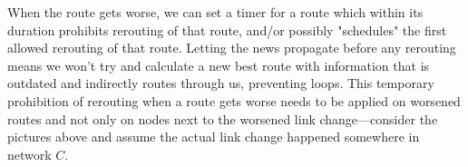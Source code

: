 \documentclass[10pt,a4paper]{article}
\begin{document}


When the route gets worse, we can set a timer for a route which within its duration prohibits rerouting of that route, and/or possibly "schedules" the first allowed rerouting of that route. Letting the news propagate before any rerouting means we won't try and calculate a new best route with information that is outdated and indirectly routes through us, preventing loops. This temporary prohibition of rerouting when a route gets worse needs to be applied on worsened routes and not only on nodes next to the worsened link change---consider the pictures above and assume the actual link change happened somewhere in network $C$.


\end{document}
